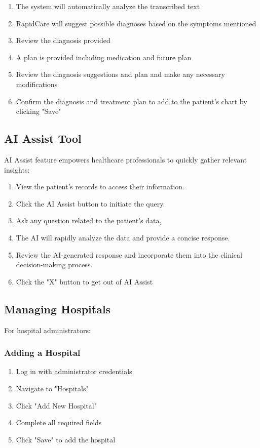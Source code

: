 \documentclass[12pt, titlepage]{article}
\begin{document}
\begin{enumerate}
\item The system will automatically analyze the transcribed text
\item RapidCare will suggest possible diagnoses based on the symptoms mentioned
\item Review the diagnosis provided
\item A plan is provided including medication and future plan
\item Review the diagnosis suggestions and plan and make any necessary modifications
\item Confirm the diagnosis and treatment plan to add to the patient's chart by clicking "Save"
\end{enumerate}

\subsection{AI Assist Tool}

AI Assist feature empowers healthcare professionals to quickly gather relevant insights:

\begin{enumerate} 
\item View the patient's records to access their information. 
\item Click the AI Assist button to initiate the query. 
\item Ask any question related to the patient’s data,
\item The AI will rapidly analyze the data and provide a concise response. 
\item Review the AI-generated response and incorporate them into the clinical decision-making process. 
\item Click the "X" button to get out of AI Assist
\end{enumerate}

\subsection{Managing Hospitals}
For hospital administrators:

\subsubsection{Adding a Hospital}
\begin{enumerate}
\item Log in with administrator credentials
\item Navigate to "Hospitals"
\item Click "Add New Hospital"
\item Complete all required fields
\item Click "Save" to add the hospital
\end{enumerate}
\end{document}
